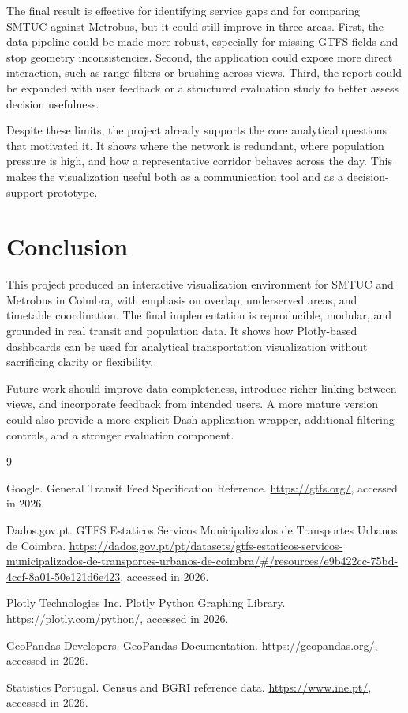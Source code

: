 \documentclass[11pt,a4paper]{article}
\begin{document}
The final result is effective for identifying service gaps and for comparing SMTUC against Metrobus, but it could still improve in three areas. First, the data pipeline could be made more robust, especially for missing GTFS fields and stop geometry inconsistencies. Second, the application could expose more direct interaction, such as range filters or brushing across views. Third, the report could be expanded with user feedback or a structured evaluation study to better assess decision usefulness.

Despite these limits, the project already supports the core analytical questions that motivated it. It shows where the network is redundant, where population pressure is high, and how a representative corridor behaves across the day. This makes the visualization useful both as a communication tool and as a decision-support prototype.

\section{Conclusion}
This project produced an interactive visualization environment for SMTUC and Metrobus in Coimbra, with emphasis on overlap, underserved areas, and timetable coordination. The final implementation is reproducible, modular, and grounded in real transit and population data. It shows how Plotly-based dashboards can be used for analytical transportation visualization without sacrificing clarity or flexibility.

Future work should improve data completeness, introduce richer linking between views, and incorporate feedback from intended users. A more mature version could also provide a more explicit Dash application wrapper, additional filtering controls, and a stronger evaluation component.

\begin{thebibliography}{9}

Google.
\newblock General Transit Feed Specification Reference.
\newblock \url{https://gtfs.org/}, accessed in 2026.

Dados.gov.pt.
\newblock GTFS Estaticos Servicos Municipalizados de Transportes Urbanos de Coimbra.
\newblock \url{https://dados.gov.pt/pt/datasets/gtfs-estaticos-servicos-municipalizados-de-transportes-urbanos-de-coimbra/#/resources/e9b422cc-75bd-4ccf-8a01-50e121d6e423}, accessed in 2026.

Plotly Technologies Inc.
\newblock Plotly Python Graphing Library.
\newblock \url{https://plotly.com/python/}, accessed in 2026.

GeoPandas Developers.
\newblock GeoPandas Documentation.
\newblock \url{https://geopandas.org/}, accessed in 2026.

Statistics Portugal.
\newblock Census and BGRI reference data.
\newblock \url{https://www.ine.pt/}, accessed in 2026.

\end{thebibliography}
\end{document}
